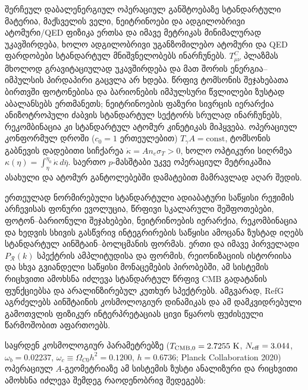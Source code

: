 \documentclass[11pt,a4paper]{article}
\begin{document}
შერჩეულ დაბალენერგიულ ოპერაციულ განშტოებაზე სტანდარტული მატერია, მაქსველის ველი, ნეიტრინოები და ადგილობრივი ატომური/QED ფიზიკა ერთსა და იმავე მეტრიკას მინიმალურად უკავშირდება, ხოლო ადგილობრივი უგანზომილებო ატომური და QED ფარდობები სტანდარტულ მნიშვნელობებს ინარჩუნებს. $T^C_{\mu\nu}$ პლაზმას მხოლოდ გრავიტაციულად უკავშირდება და მათ შორის ენერგია–იმპულსის პირდაპირი გაცვლა არ ხდება. წრფივ ტომსონის შეჯახებათა ბირთვში ფოტონებისა და ბარიონების იმპულსური წვლილები ზუსტად აბალანსებს ერთმანეთს; ნეიტრინოების ფაზური სივრცის იერარქია ანიზოტროპული ძაბვის სტანდარტულ სექტორს სრულად ინარჩუნებს, რეკომბინაცია კი სტანდარტულ ატომურ კინეტიკას მიჰყვება. ოპერაციულ კონფორმულ დროში ($c_0=1$ ერთეულებით) $T_\gamma A=\mathrm{const}$, ტომსონის გაბნევის დადებითი სიჩქარეა $\dot\kappa=A n_e\sigma_T>0$, ხოლო ოპტიკური სიღრმეა $\kappa(\eta)=\int_\eta^{\eta_0}\dot\kappa\,d\bar\eta$. საერთო $p$-მასშტაბი უკვე ოპერაციულ მეტრიკაშია ასახული და ატომურ განტოლებებში დამატებით მამრავლად აღარ შედის.

ერთეულად ნორმირებული სტანდარტული ადიაბატური საწყისი რეჟიმის არჩევისას ფონური ევოლუცია, წრფივი სკალარული შეშფოთებები, ფოტონ–ბარიონული შეჯახებები, ნეიტრინოების იერარქია, რეკომბინაცია და ხედვის სხივის გასწვრივ ინტეგრირების საწყისი ამოცანა ზუსტად იღებს სტანდარტულ აინშტაინ–ბოლცმანის ფორმას. ერთი და იმავე პირველადი $P_{\mathcal R}(k)$ სპექტრის ამპლიტუდისა და ფორმის, რეიონიზაციის ისტორიისა და სხვა გვიანდელი საწყისი მონაცემების პირობებში, ამ სისტემის რიცხვითი ამოხსნა იძლევა სტანდარტულ წრფივ CMB გადატანის ფუნქციებსა და არალინზირებულ კუთხურ სპექტრებს. ამგვარად, RefG აგრძელებს აინშტაინის კოსმოლოგიურ დინამიკას და ამ დამკვიდრებული გამოთვლის ფიზიკურ ინტერპრეტაციას ცივი წყაროს ფუძისეული წარმოშობით აფართოებს.

საყრდენ კოსმოლოგიურ პარამეტრებზე ($T_{\rm CMB,0} = 2.7255\text{ K}$, $N_{\rm eff} = 3.044$, $\omega_b = 0.02237$, $\omega_c \equiv \Omega_{C0}h^2 = 0.1200$, $h = 0.6736$; Planck Collaboration 2020) ოპერაციულ $A$-გეომეტრიაზე ამ სისტემის ზუსტი ანალიზური და რიცხვითი ამოხსნა იძლევა შემდეგ რაოდენობრივ შედეგებს:
\end{document}
